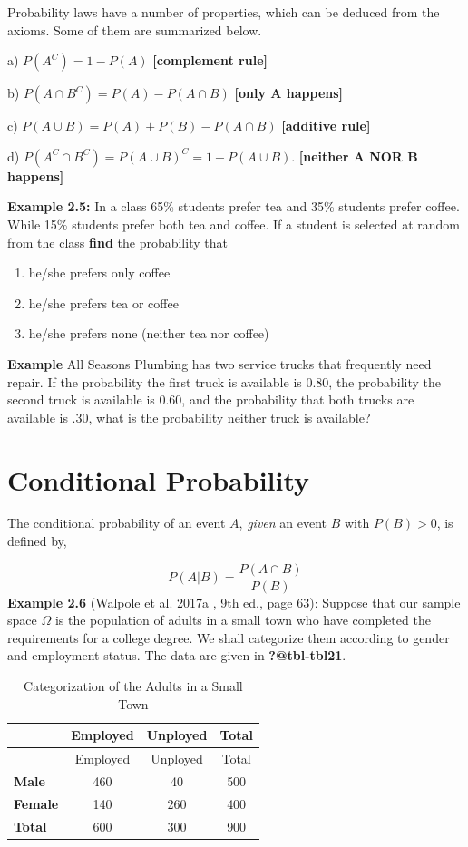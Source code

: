 \documentclass[
  11pt,
  letterpaper,
  DIV=11,
  numbers=noendperiod]{scrreprt}
\begin{document}
Probability laws have a number of properties, which can be deduced from
the axioms. Some of them are summarized below.

a) \(P(A^C)=1-P(A)\) \textbf{{[}complement rule{]}}

b) \(P(A \cap B^C )=P(A)-P(A \cap B)\) \textbf{{[}only A happens{]}}

c) \(P(A \cup B)=P(A)+P(B)-P(A \cap B)\) \textbf{{[}additive rule{]}}

d) \(P(A^C \cap B^C )=P(A∪B)^C=1-P(A \cup B)\). \textbf{{[}neither A NOR
B happens{]}}

\textbf{Example 2.5:} In a class 65\% students prefer tea and 35\%
students prefer coffee. While 15\% students prefer both tea and coffee.
If a student is selected at random from the class \textbf{find} the
probability that

\begin{enumerate}
\def\labelenumi{\roman{enumi})}
\item
  he/she prefers only coffee
\item
  he/she prefers tea or coffee
\item
  he/she prefers none (neither tea nor coffee)
\end{enumerate}

\textbf{Example} All Seasons Plumbing has two service trucks that
frequently need repair. If the probability the first truck is available
is 0.80, the probability the second truck is available is 0.60, and the
probability that both trucks are available is .30, what is the
probability neither truck is available?

\section{Conditional Probability}\label{conditional-probability}

The conditional probability of an event \(A\), \emph{given} an event
\(B\) with \(P(B) > 0\), is defined by,

\[P(A|B)=\frac{P(A\cap B)}{P(B)}\] \textbf{Example 2.6} (Walpole et al.
2017a , 9th ed., page 63): Suppose that our sample space \(\Omega\) is
the population of adults in a small town who have completed the
requirements for a college degree. We shall categorize them according to
gender and employment status. The data are given in
\textbf{?@tbl-tbl21}.

\begin{longtable}[]{@{}lccc@{}}
\caption{Categorization of the Adults in a Small Town}\tabularnewline
\toprule\noalign{}
& Employed & Unployed & Total \\
\midrule\noalign{}
\endfirsthead
\toprule\noalign{}
& Employed & Unployed & Total \\
\midrule\noalign{}
\endhead
\bottomrule\noalign{}
\endlastfoot
\textbf{Male} & 460 & 40 & 500 \\
\textbf{Female} & 140 & 260 & 400 \\
\textbf{Total} & 600 & 300 & 900 \\
\end{longtable}
\end{document}
